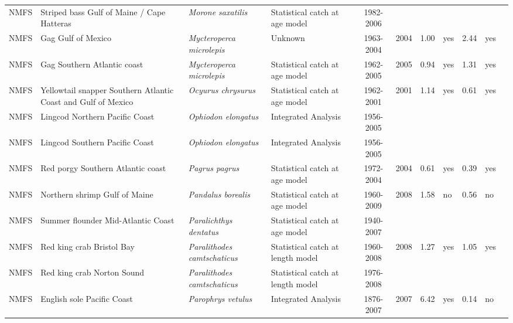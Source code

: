 \begin{longtable}{p{1.8cm}p{3.5cm}p{3.5cm}p{3cm}cccp{0.9cm}cp{0.9cm}c}
  NMFS & Striped bass Gulf of Maine / Cape Hatteras & \textit{Morone saxatilis} & Statistical catch at age model & 1982-2006 &  &  &  &  &  & \cite{07AssessmentReport.pdf} \\ 
  NMFS & Gag Gulf of Mexico & \textit{Mycteroperca microlepis} & Unknown & 1963-2004 & 2004 & 1.00 & yes & 2.44 & yes & \cite{JENSEN_GAGGM_2007.pdf} \\ 
  NMFS & Gag Southern Atlantic coast & \textit{Mycteroperca microlepis} & Statistical catch at age model & 1962-2005 & 2005 & 0.94 & yes & 1.31 & yes & \cite{JENSEN_GAGSATLC_2006.pdf} \\ 
  NMFS & Yellowtail snapper Southern Atlantic Coast and Gulf of Mexico & \textit{Ocyurus chrysurus} & Statistical catch at age model & 1962-2001 & 2001 & 1.14 & yes & 0.61 & yes & \cite{2003_SEDAR_Yellowtailsnapper.pdf} \\ 
  NMFS & Lingcod Northern Pacific Coast & \textit{Ophiodon elongatus} & Integrated Analysis & 1956-2005 &  &  &  &  &  & \cite{2005-SAFE-WClingcod.pdf} \\ 
  NMFS & Lingcod Southern Pacific Coast & \textit{Ophiodon elongatus} & Integrated Analysis & 1956-2005 &  &  &  &  &  & \cite{2005_SAFE_Wclingcod.pdf} \\ 
  NMFS & Red porgy Southern Atlantic coast & \textit{Pagrus pagrus} & Statistical catch at age model & 1972-2004 & 2004 & 0.61 & yes & 0.39 & yes & \cite{JENSEN_RPORGYSATLC_2006.pdf} \\ 
  NMFS & Northern shrimp Gulf of Maine & \textit{Pandalus borealis} & Statistical catch at age model & 1960-2009 & 2008 & 1.58 & no & 0.56 & no & \cite{2008ShrimpAssessment.pdf} \\ 
  NMFS & Summer flounder Mid-Atlantic Coast & \textit{Paralichthys dentatus} & Statistical catch at age model & 1940-2007 &  &  &  &  &  & \cite{NMFS-MATLC-Paralichthysdentatus-2008.pdf} \\ 
  NMFS & Red king crab Bristol Bay & \textit{Paralithodes camtschaticus} & Statistical catch at length model & 1960-2008 & 2008 & 1.27 & yes & 1.05 & yes & \cite{CRABSAFE2008.pdf} \\ 
  NMFS & Red king crab Norton Sound & \textit{Paralithodes camtschaticus} & Statistical catch at length model & 1976-2008 &  &  &  &  &  & \cite{CRABSAFE2008.pdf} \\ 
  NMFS & English sole Pacific Coast & \textit{Parophrys vetulus} & Integrated Analysis & 1876-2007 & 2007 & 6.42 & yes & 0.14 & no & \cite{NWFSC-ESOLEPCOAST-2007-EnglishSole.pdf} \\ 

\end{longtable}
